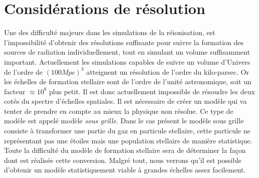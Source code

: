 \section{Considérations de résolution}

Une des difficulté majeurs dans les simulations de la réionisation, est l'impossibilité d'obtenir des résolutions suffisante pour suivre la formation des sources de radiation individuellement, tout en simulant un volume suffisamment important.
Actuellement les simulations capables de suivre un volume d'Univers de l'ordre de $(100Mpc)^3$ atteignent un résolution de l'ordre du kilo-parsec.
Or les échelles de formation stellaire sont de l'ordre de l'unité astronomique, soit un facteur $\approx 10^8$ plus petit.
Il est donc actuellement impossible de résoudre les deux cotés du spectre d'échelles spatiales.
Il est nécessaire de créer un modèle qui va tenter de prendre en compte au mieux la physique non résolue.
Ce type de modèle est appelé modèle \textit{sous grille}.
Dans le cas présent le modèle sous grille consiste à transformer une partie du gaz en particule stellaire, cette particule ne représentant pas une étoiles mais une population stellaire de manière statistique.
Toute la difficulté du modèle de formation stellaire sera de déterminer la façon dont est réalisée cette conversion.
Malgré tout, nous verrons qu'il est possible d'obtenir un modèle statistiquement viable à grandes échelles assez facilement.



